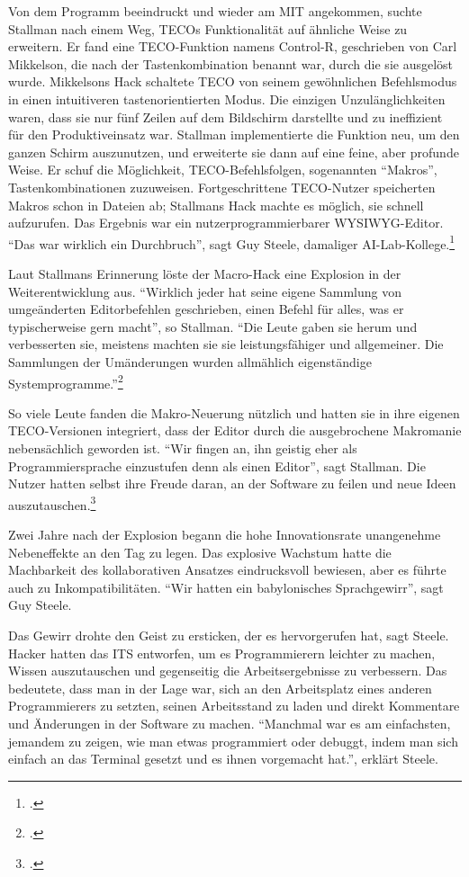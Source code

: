Von dem Programm beeindruckt und wieder am MIT angekommen, suchte Stallman nach einem Weg, TECOs Funktionalität auf ähnliche Weise zu erweitern. Er fand eine TECO-Funktion namens Control-R, geschrieben von Carl Mikkelson, die nach der Tastenkombination benannt war, durch die sie ausgelöst wurde. Mikkelsons Hack schaltete TECO von seinem gewöhnlichen Befehlsmodus in einen intuitiveren tastenorientierten Modus. Die einzigen Unzulänglichkeiten waren, dass sie nur fünf Zeilen auf dem Bildschirm darstellte und zu ineffizient für den Produktiveinsatz war. Stallman implementierte die Funktion neu, um den ganzen Schirm auszunutzen, und erweiterte sie dann auf eine feine, aber profunde Weise. Er schuf die Möglichkeit, TECO-Befehlsfolgen, sogenannten "`Makros"', Tastenkombinationen zuzuweisen. Fortgeschrittene TECO-Nutzer speicherten Makros schon in Dateien ab; Stallmans Hack machte es möglich, sie schnell aufzurufen. Das Ergebnis war ein nutzerprogrammierbarer WYSIWYG-Editor. "`Das war wirklich ein Durchbruch"', sagt Guy Steele, damaliger AI-Lab-Kollege.\footcite[][]{rmsetfse}

Laut Stallmans Erinnerung löste der Macro-Hack eine Explosion in der Weiterentwicklung aus. "`Wirklich jeder hat seine eigene Sammlung von umgeänderten Editorbefehlen geschrieben, einen Befehl für alles, was er typischerweise gern macht"', so Stallman. "`Die Leute gaben sie herum und verbesserten sie, meistens machten sie sie leistungsfähiger und allgemeiner. Die Sammlungen der Umänderungen wurden allmählich eigenständige Systemprogramme."'\footcite[][]{rmsetfse}

So viele Leute fanden die Makro-Neuerung nützlich und hatten sie in ihre eigenen TECO-Versionen integriert, dass der Editor durch die ausgebrochene Makromanie nebensächlich geworden ist. "`Wir fingen an, ihn geistig eher als Programmiersprache einzustufen denn als einen Editor"', sagt Stallman. Die Nutzer hatten selbst ihre Freude daran, an der Software zu feilen und neue Ideen auszutauschen.\footcite[][]{rmsetfse}

Zwei Jahre nach der Explosion begann die hohe Innovationsrate unangenehme Nebeneffekte an den Tag zu legen. Das explosive Wachstum hatte die Machbarkeit des kollaborativen Ansatzes eindrucksvoll bewiesen, aber es führte auch zu Inkompatibilitäten. "`Wir hatten ein babylonisches Sprachgewirr"', sagt Guy Steele.

Das Gewirr drohte den Geist zu ersticken, der es hervorgerufen hat, sagt Steele. Hacker hatten das ITS entworfen, um es Programmierern leichter zu machen, Wissen auszutauschen und gegenseitig die Arbeitsergebnisse zu verbessern. Das bedeutete, dass man in der Lage war, sich an den Arbeitsplatz eines anderen Programmierers zu setzten, seinen Arbeitsstand zu laden und direkt Kommentare und Änderungen in der Software zu machen. "`Manchmal war es am einfachsten, jemandem zu zeigen, wie man etwas programmiert oder debuggt, indem man sich einfach an das Terminal gesetzt und es ihnen vorgemacht hat."', erklärt Steele.

